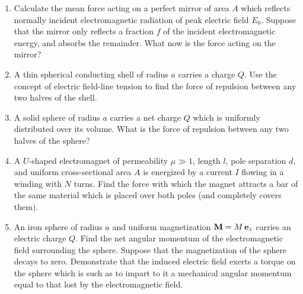{\begin{enumerate}
consistent with Amp\`{e}re's law.
\item Calculate the mean force acting  on a perfect mirror of area $A$ which reflects normally incident electromagnetic radiation of peak electric field $E_0$.
Suppose that the mirror only reflects a fraction $f$ of the incident electromagnetic energy, and absorbs the remainder. What now is the force
acting on the mirror?
\item A thin spherical conducting shell of radius $a$ carries a charge
$Q$. Use the concept of electric field-line tension to find the force of repulsion between any two halves of the shell.
\item A solid sphere of radius $a$ carries a net charge $Q$ which
is uniformly distributed over its volume. What is the force of
repulsion between any two halves of the sphere?
\item A $U$-shaped electromagnet of permeability $\mu\gg 1$, length $l$, pole separation $d$, and uniform  cross-sectional
area $A$ is energized by a current $I$ flowing in a winding with $N$ turns.
Find the force with which the magnet attracts a bar of the same material
which is placed over both poles (and completely covers them).
\item An iron sphere of radius $a$ and uniform magnetization
${\bf M} = M\,{\bf e}_z$ carries an electric charge $Q$. Find the net angular
momentum of the electromagnetic field surrounding the sphere. Suppose that
the magnetization of the sphere decays to zero. Demonstrate that the induced
electric field exerts a torque on the sphere which is such as to impart to it a mechanical angular momentum equal to that lost by the electromagnetic field.
\end{enumerate}
\renewcommand{\theenumi}{arabic{enumi}}
}
